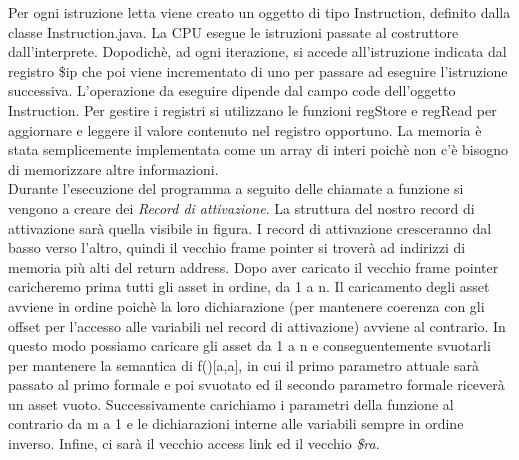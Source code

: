 \documentclass[12pt, a4paper]{report}
\begin{document}
Per ogni istruzione letta viene creato un oggetto di tipo Instruction, definito dalla classe Instruction.java. La CPU esegue le istruzioni passate al costruttore dall’interprete. Dopodichè, ad ogni iterazione, si accede all’istruzione indicata dal registro \$ip che poi viene incrementato di uno per passare ad eseguire
l’istruzione successiva. L’operazione da eseguire dipende dal campo code dell’oggetto Instruction.
Per gestire i registri si utilizzano le funzioni regStore e regRead per aggiornare e leggere il valore contenuto nel registro opportuno. La memoria è stata semplicemente implementata come un array di interi poichè non c'è bisogno di memorizzare altre informazioni.\\
Durante l'esecuzione del programma a seguito delle chiamate a funzione si vengono a creare dei \emph{Record di attivazione}. La struttura del nostro record di attivazione sarà quella visibile in figura. I record di attivazione cresceranno dal basso verso l'altro, quindi il vecchio frame pointer si troverà ad indirizzi di memoria più alti del return address. Dopo aver caricato il vecchio frame pointer caricheremo prima tutti gli asset in ordine, da 1 a n. Il caricamento degli asset avviene in ordine poichè la loro dichiarazione (per mantenere coerenza con gli offset per l'accesso alle variabili nel record di attivazione) avviene al contrario. In questo modo possiamo caricare gli asset da 1 a n e conseguentemente svuotarli per mantenere la semantica di f()[a,a], in cui il primo parametro attuale sarà passato al primo formale e poi svuotato ed il secondo parametro formale riceverà un asset vuoto.  Successivamente carichiamo i parametri della funzione al contrario da m a 1 e le dichiarazioni interne alle variabili sempre in ordine inverso. Infine, ci sarà il vecchio access link ed il vecchio \emph{\$ra}.
\end{document}
